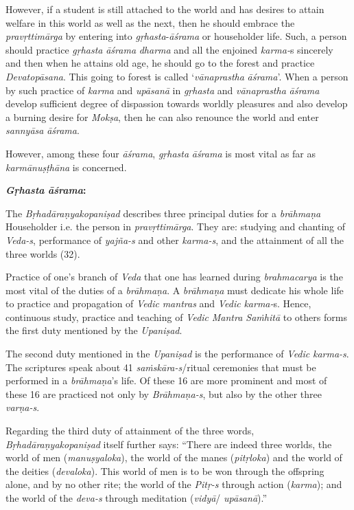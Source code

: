 However, if a student is still attached to the world and has desires to attain welfare in this world as well as the next, then he should embrace the \emph{pravṛttimārga} by entering into \emph{gṛhasta}-\emph{āśrama} or householder life. Such, a person should practice \emph{gṛhasta} \emph{āśrama} \emph{dharma} and all the enjoined \emph{karma-}s sincerely and then when he attains old age, he should go to the forest and practice \emph{Devatopāsana}. This going to forest is called `\emph{vānaprastha} \emph{āśrama}'. When a person by such practice of \emph{karma} and \emph{upāsanā} in \emph{gṛhasta} and \emph{vānaprastha} \emph{āśrama} develop sufficient degree of dispassion towards worldly pleasures and also develop a burning desire for \emph{Mokṣa}, then he can also renounce the world and enter \emph{sannyāsa} \emph{āśrama}.

However, among these four \emph{āśrama}, \emph{gṛhasta} \emph{āśrama} is most vital as far as \emph{karmānuṣṭhāna} is concerned.

\textbf{\emph{Gṛhasta} \emph{āśrama}:}

The \emph{Bṛhadāraṇyakopaniṣad} describes three principal duties for a \emph{brāhmaṇa} Householder i.e. the person in \emph{pravṛttimārga}. They are: studying and chanting of \emph{Veda-s}, performance of \emph{yajña-s} and other \emph{karma-s}, and the attainment of all the three worlds (32).

Practice of one's branch of \emph{Veda} that one has learned during \emph{brahmacarya} is the most vital of the duties of a \emph{brāhmaṇa}. A \emph{brāhmaṇa} must dedicate his whole life to practice and propagation of \emph{Vedic} \emph{mantras} and \emph{Vedic} \emph{karma-}s. Hence, continuous study, practice and teaching of \emph{Vedic} \emph{Mantra Saṁhitā} to others forms the first duty mentioned by the \emph{Upaniṣad}.

The second duty mentioned in the \emph{Upaniṣad} is the performance of \emph{Vedic} \emph{karma-s}. The scriptures speak about 41 \emph{saṁskāra-s}/ritual ceremonies that must be performed in a \emph{brāhmaṇa}'s life. Of these 16 are more prominent and most of these 16 are practiced not only by \emph{Brāhmaṇa-s}, but also by the other three \emph{varṇa-s}.

Regarding the third duty of attainment of the three words, \emph{Bṛhadāraṇya\-kopaniṣad} itself further says: ``There are indeed three worlds, the world of men (\emph{manuṣyaloka}), the world of the manes (\emph{pitṛloka}) and the world of the deities (\emph{devaloka}). This world of men is to be won through the offspring alone, and by no other rite; the world of the \emph{Pitṛ-s} through action (\emph{karma}); and the world of the \emph{deva-s} through meditation (\emph{vidyā}/ \emph{upāsanā}).''

